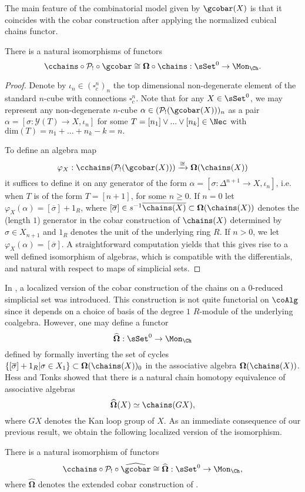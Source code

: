 The main feature of the combinatorial model given by $\gcobar(X)$ is that it coincides with the cobar construction after applying the normalized cubical chains functor. 

\begin{proposition}
There is a natural isomorphisms of functors 
$$\cchains \circ \mathcal{P}_! \circ \gcobar \cong \mathbf{\Omega} \circ \chains: \sSet^0 \to \Mon_{\Ch}.$$
\end{proposition}

\begin{proof} 
Denote by $\iota_n \in (\square^n_c)_n$ the top dimensional non-degenerate element of the standard $n$-cube with connections $\square^n_c$. Note that for any $X \in \sSet^0$, we may represent any non-degenerate $n$-cube $\alpha \in (\mathcal{P}_!(\gcobar(X)))_n$ as a pair $\alpha=[\sigma: \mathcal{Y}(T) \to X, \iota_n]$ for some $T=[n_1] \vee ... \vee [n_k] \in \Nec$ with $\text{dim}(T)=n_1+ ...+n_k-k=n.$

To define an algebra map
$$\varphi_X: \cchains(\mathcal{P}_!(\gcobar(X))) \xrightarrow{\cong} \mathbf{\Omega}(\chains(X))$$
it suffices to define it on any generator of the form $\alpha=[\sigma \colon \Delta^{n+1} \to X, \iota_{n}]$, i.e. when $T$ is of the form $T=[n+1]$, for some $n\geq0$. If $n=0$ let $\varphi_X(\alpha)= [\overline{\sigma}]+ 1_R$, where $[\overline{\sigma}] \in s^{-1} \overline{ \chains(X)} \subset \mathbf{\Omega}(\chains(X))$ denotes the (length $1$) generator in the cobar construction of $\chains(X)$ determined by $\sigma \in X_{n+1}$ and $1_R$ denotes the unit of the underlying ring $R$. If $n>0$, we let $\varphi_X(\alpha)=[\overline{\sigma}]$. A straightforward computation yields that this gives rise to a well defined isomorphism of algebras, which is compatible with the differentials, and natural with respect to maps of simplicial sets.  
\end{proof}
In \cite{Hess and Tonks}, a localized version of the cobar construction of the chains on a $0$-reduced simplicial set was introduced. This construction is not quite functorial on $\coAlg$ since it depends on a choice of basis of the degree $1$ $R$-module of the underlying coalgebra. However, one may define a functor $$\widehat{\mathbf{\Omega}}: \sSet^0 \to \Mon_{\Ch}$$
defined by formally inverting the set of cycles $\{ [\overline{\sigma}]+1_R | \sigma \in X_1 \} \subset \mathbf{\Omega}(\chains(X))_0$ in the associative algebra $\mathbf{\Omega}(\chains(X))$. Hess and Tonks showed that there is a natural chain homotopy equivalence of associative algebras $$\widehat{\mathbf{\Omega}}(X)\simeq \chains(GX),$$ where $GX$ denotes the Kan loop group of $X$. As an immediate consequence of our previous result, we obtain the following localized version of the isomorphism.

\begin{corollary}
There is a natural isomorphism of functors
$$\cchains \circ \mathcal{P}_! \circ \widehat{\gcobar} \cong \widehat{\mathbf{\Omega}} :\sSet^0 \to \Mon_{\Ch},$$ where $\widehat{\mathbf{\Omega}}$ denotes the extended cobar construction of \cite{Hess and Tonks}. 
\end{corollary}



